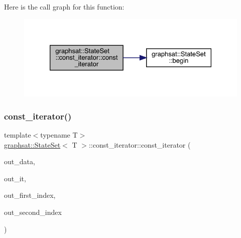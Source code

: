 Here is the call graph for this function\+:
\nopagebreak
\begin{figure}[H]
\begin{center}
\leavevmode
\includegraphics[width=326pt]{classgraphsat_1_1_state_set_1_1const__iterator_a0ef15f55d1a11cebb203d15a1f743460_cgraph}
\end{center}
\end{figure}
\mbox{\label{classgraphsat_1_1_state_set_1_1const__iterator_acbeaca441a996278c065901779eeab12}} 
\subsubsection{\texorpdfstring{const\_iterator()}{const\_iterator()}\hspace{0.1cm}{\footnotesize\ttfamily [2/3]}}
{\footnotesize\ttfamily template$<$typename T$>$ \\
\mbox{\hyperlink{classgraphsat_1_1_state_set}{graphsat\+::\+State\+Set}}$<$ T $>$\+::const\+\_\+iterator\+::const\+\_\+iterator (\begin{DoxyParamCaption}\item[{const \mbox{\hyperlink{classgraphsat_1_1_state_set_a6474a59203fade7146aacfd0e277ecf4}{State\+Set\+\_\+t}} $\ast$}]{out\+\_\+data,  }\item[{typename unordered\+\_\+map$<$ int, pair$<$ vector$<$ T $>$, vector$<$ int $>$$>$$>$\+::\mbox{\hyperlink{classgraphsat_1_1_state_set_1_1const__iterator}{const\+\_\+iterator}}}]{out\+\_\+it,  }\item[{size\+\_\+t}]{out\+\_\+first\+\_\+index,  }\item[{size\+\_\+t}]{out\+\_\+second\+\_\+index }\end{DoxyParamCaption})\hspace{0.3cm}{\ttfamily [inline]}}

